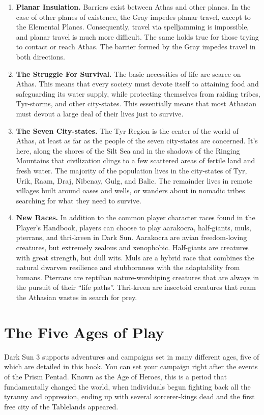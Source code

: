 \begin{enumerate}
\item \textbf{Planar Insulation.} Barriers exist between Athas and other planes. In the case of other planes of existence, the Gray impedes planar travel, except to the Elemental Planes. Consequently, travel via spelljamming is impossible, and planar travel is much more difficult. The same holds true for those trying to contact or reach Athas. The barrier formed by the Gray impedes travel in both directions.
\item \textbf{The Struggle For Survival.} The basic necessities of life are scarce on Athas. This means that every society must devote itself to attaining food and safeguarding its water supply, while protecting themselves from raiding tribes, Tyr-storms, and other city-states. This essentially means that most Athasian must devout a large deal of their lives just to survive.
\item \textbf{The Seven City-states.} The Tyr Region is the center of the world of Athas, at least as far as the people of the seven city-states are concerned. It's here, along the shores of the Silt Sea and in the shadows of the Ringing Mountains that civilization clings to a few scattered areas of fertile land and fresh water. The majority of the population lives in the city-states of Tyr, Urik, Raam, Draj, Nibenay, Gulg, and Balic. The remainder lives in remote villages built around oases and wells, or wanders about in nomadic tribes searching for what they need to survive.
\item \textbf{New Races.} In addition to the common player character races found in the Player's Handbook, players can choose to play aarakocra, half-giants, muls, pterrans, and thri-kreen in {\tableheader Dark Sun}. Aarakocra are avian freedom-loving creatures, but extremely zealous and xenophobic. Half-giants are creatures with great strength, but dull wits. Muls are a hybrid race that combines the natural dwarven resilience and stubbornness with the adaptability from humans. Pterrans are reptilian nature-worshiping creatures that are always in the pursuit of their ``life paths''. Thri-kreen are insectoid creatures that roam the Athasian wastes in search for prey.
\end{enumerate}

\section{The Five Ages of Play}

{\tableheader Dark Sun} 3 supports adventures and campaigns set in many different ages, five of which are detailed in this book. You can set your campaign right after the events of the Prism Pentad. Known as the Age of Heroes, this is a period that fundamentally changed the world, when individuals begun fighting back all the tyranny and oppression, ending up with several sorcerer-kings dead and the first free city of the Tablelands appeared.

